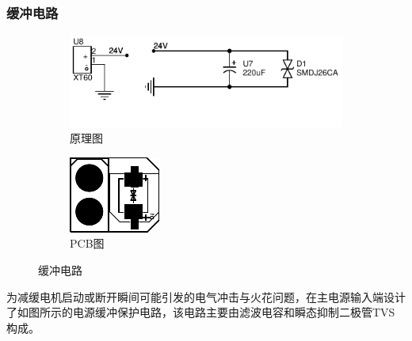 \documentclass{beamer}
\begin{document}
	
	\begin{frame}
		\frametitle{缓冲电路}
			\begin{figure}[t]
				\centering
				\captionsetup{font=scriptsize} 
				\begin{subfigure}{0.45\textwidth}
					\centering
					\includegraphics[width=1.3\linewidth]{img/chapter4/huanchong}
					\caption{原理图}
				\end{subfigure}
				\hfill
				\begin{subfigure}{0.45\textwidth}
					\centering
					\includegraphics[width=0.7\linewidth]{img/chapter4/huanchongpcb}
					\caption{PCB图}
				\end{subfigure}
				
				\captionsetup{font=scriptsize} 
				\caption{缓冲电路}

			\end{figure}
			为减缓电机启动或断开瞬间可能引发的电气冲击与火花问题，在主电源输入端设计了如图所示的电源缓冲保护电路，该电路主要由滤波电容和瞬态抑制二极管TVS构成。
	\end{frame}
	
	
	
\end{document}

